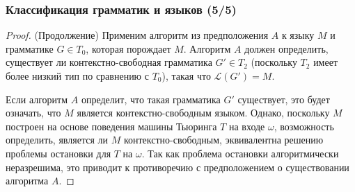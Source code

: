 \begin{frame}
    \frametitle{Классификация грамматик и языков (5/5)}
    \begin{proof} (Продолжение)
        Применим алгоритм из предположения $A$ к языку $M$ и грамматике $G \in T_0$, которая порождает $M$. Алгоритм $A$ должен определить, существует ли контекстно-свободная грамматика $G' \in T_2$ (поскольку $T_2$ имеет более низкий тип по сравнению с $T_0$), такая что $\mathcal{L}(G') = M$.

        Если алгоритм $A$ определит, что такая грамматика $G'$ существует, это будет означать, что $M$ является контекстно-свободным языком. Однако, поскольку $M$ построен на основе поведения машины Тьюринга $T$ на входе $\omega$, возможность определить, является ли $M$ контекстно-свободным, эквивалентна решению проблемы остановки для $T$ на $\omega$. Так как проблема остановки алгоритмически неразрешима, это приводит к противоречию с предположением о существовании алгоритма $A$.
    \end{proof}
    
    \bigskip
\end{frame}


